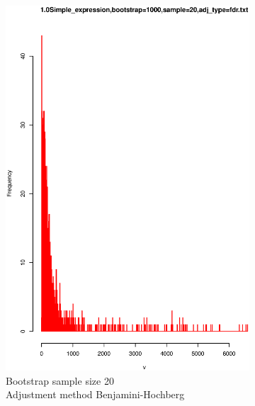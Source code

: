 \documentclass[11pt,a4paper,oneside]{article}
\begin{document}
\begin{figure}
\begin{subfigure}[b]{0.4\textwidth}
\includegraphics[width=\textwidth]{1.0Simple_expression,bootstrap=1000,sample=20,adj_type=fdr.txt.eps}
\caption{Bootstrap sample size 20\\Adjustment method Benjamini-Hochberg}
\label{fig:pm2}
\end{subfigure}
\\
\begin{subfigure}[b]{0.4\textwidth}

\end{subfigure}
\end{figure}
\end{document}
